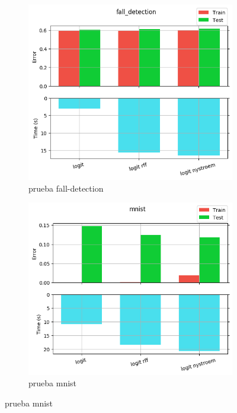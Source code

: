 \begin{figure}[ht]
  \centering
  \begin{subfigure}[b]{0.5\linewidth}
    \centering\captionsetup{width=.8\linewidth}\includegraphics[width=\imgscale\linewidth]{Figures/2_1/fall_detection}
    \caption{prueba fall-detection}
    \label{fig:2_1_fall_detection}
  \end{subfigure}%
  \begin{subfigure}[b]{0.5\linewidth}
    \centering\captionsetup{width=.8\linewidth}\includegraphics[width=\imgscale\linewidth]{Figures/2_1/mnist}
    \caption{prueba mnist}
    \label{fig:2_1_mnist}
  \end{subfigure}
\end{figure}


